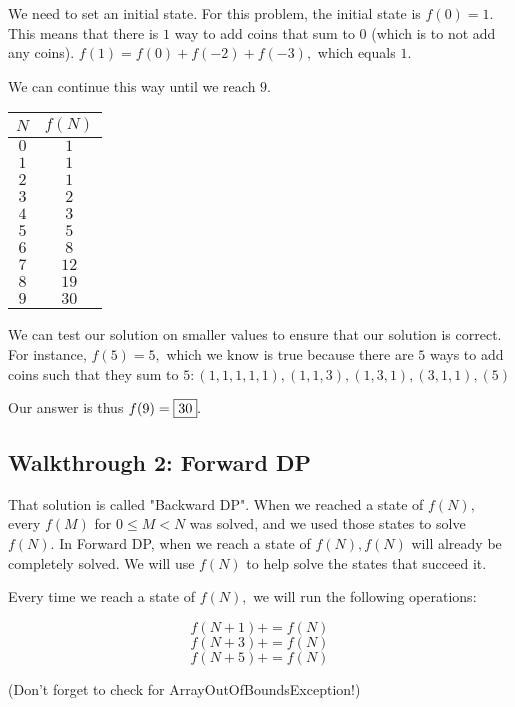 \documentclass{article}
\begin{document}
We need to set an initial state. For this problem, the initial state is $f(0) = 1.$ This means that there is $1$ way to add coins that sum to $0$ (which is to not add any coins). $f(1) = f(0) + f(-2) + f(-3),$ which equals $1.$

We can continue this way until we reach $9.$

\begin{center}
    \begin{tabular}{c|c}
        \hline
        $N$& $f(N)$ \\
        \hline
        $0$ & $1$ \\
        \hline
        $1$ & $1$ \\
        \hline
        $2$ & $1$ \\
        \hline
        $3$ & $2$ \\
        \hline
        $4$ & $3$ \\
        \hline
        $5$ & $5$ \\
        \hline
        $6$ & $8$ \\
        \hline
        $7$ & $12$ \\
        \hline
        $8$ & $19$ \\
        \hline
        $9$ & $30$ \\
    \end{tabular}
\end{center}

We can test our solution on smaller values to ensure that our solution is correct. For instance, $f(5) = 5,$ which we know is true because there are $5$ ways to add coins such that they sum to $5: (1,1,1,1,1), (1,1,3), (1,3,1), (3,1,1), (5)$

Our answer is thus $f(9) = \fbox{30}.$

\subsection{Walkthrough 2: Forward DP}
That solution is called "Backward DP". When we reached a state of $f(N),$ every $f(M)$ for $0 \leq M < N$ was solved, and we used those states to solve $f(N).$ In Forward DP, when we reach a state of $f(N), f(N)$ will already be completely solved. We will use $f(N)$ to help solve the states that succeed it.

Every time we reach a state of $f(N),$ we will run the following operations:

$$f(N+1) += f(N)$$
$$f(N+3) += f(N)$$
$$f(N+5) += f(N)$$

(Don't forget to check for ArrayOutOfBoundsException!)
\end{document}
